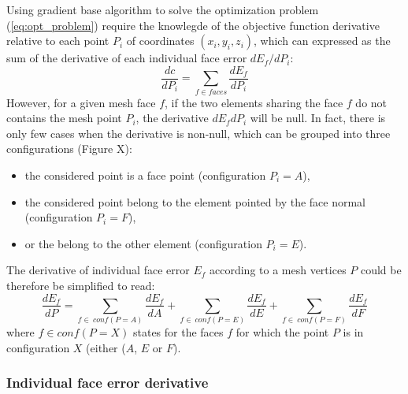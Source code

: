 \documentclass[11pt]{article}
\begin{document}
Using gradient base algorithm to solve the optimization problem (\ref{eq:opt_problem}) require the knowlegde of the objective function derivative relative to each point $P_i$ of coordinates $(x_i,y_i,z_i)$, which can expressed as the sum of the derivative of each individual face error $d E_f / dP_i$:
%
\begin{equation}
\frac{dc}{dP_i} = \sum_{f \in faces} \frac{d E_f}{d P_i}
\end{equation}
%
However, for a given mesh face $f$, if the two elements sharing the face $f$ do not contains the mesh point $P_i$, the derivative ${d E_f}{d P_i}$ will be null.
In fact, there is only few cases when the derivative is non-null, which can be grouped into three configurations (Figure X):
\begin{itemize}
\item the considered point is a face point (configuration $P_i = A$),
\item the considered point belong to the element pointed by the face normal (configuration $P_i = F$),
\item or the belong to the other element (configuration $P_i = E$).
\end{itemize}
%
The derivative of individual face error $E_f$ according to a mesh vertices $P$ could be therefore be simplified to read:
%
\begin{equation}
\frac{dE_f}{dP} = \sum_{f\in\ conf(P=A)} \frac{dE_f}{dA} + \sum_{f\in\ conf(P=E)} \frac{dE_f}{dE} +
\sum_{f\in\ conf(P=F)} \frac{dE_f}{dF} 
\end{equation}
%
where $f \in conf(P=X)$ states for the faces $f$ for which the point $P$ is in configuration $X$ (either ($A$, $E$ or $F$). 


\subsubsection{Individual face error derivative}
\end{document}
